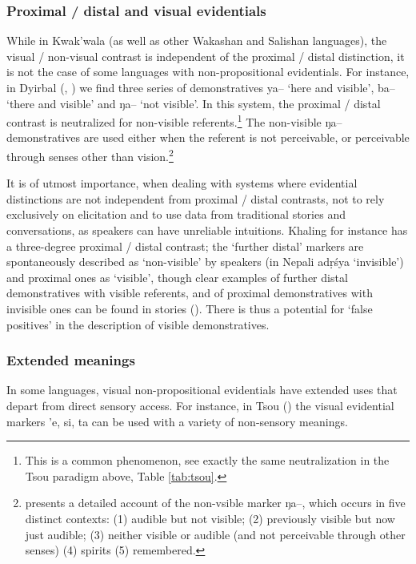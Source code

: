 \documentclass[oneside,a4paper,11pt]{article}
\newcommand{\ipa}[1]{{\phon \mbox{#1}}} %
\begin{document}
\subsubsection{Proximal / distal and visual evidentials} \label{sec:proximal}
While in Kwak'wala (as well as other Wakashan and Salishan languages), the visual / non-visual contrast is independent of the proximal / distal distinction, it is not the case of some languages with non-propositional evidentials. For instance, in Dyirbal (\citealt[45]{dixon72dyirbal}, \citealt{dixon14nonvisible}) we find three series of demonstratives \ipa{ya--} `here and visible', \ipa{ba--} `there and visible' and \ipa{ŋa--} `not visible'. In this system, the proximal / distal contrast is neutralized for non-visible referents.\footnote{This is a common phenomenon, see exactly the same neutralization in the Tsou paradigm above, Table \ref{tab:tsou}.} The non-visible \ipa{ŋa--} demonstratives are used either when the referent is not perceivable, or perceivable through senses other than vision.\footnote{\citet{dixon14nonvisible} presents a detailed account of the non-vsible marker  \ipa{ŋa--}, which occurs in five distinct contexts: (1) audible but not visible; (2) previously visible but now just audible; (3) neither visible or audible (and not perceivable through other senses) (4) spirits (5) remembered.  } 

It is of utmost importance, when dealing with systems where evidential distinctions are not independent from proximal / distal contrasts, not to rely exclusively on elicitation and to use data from traditional stories and conversations, as speakers can have unreliable intuitions. Khaling for instance has a three-degree proximal / distal contrast; the `further distal' markers are spontaneously described as `non-visible' by speakers (in Nepali \ipa{adṛśya} `invisible') and proximal ones as `visible', though clear examples of further distal demonstratives with visible referents, and of proximal demonstratives with invisible ones can be found in stories (\citealt[399]{jacques14auditory}). There is thus a potential for `false positives' in the description of visible demonstratives.

\subsubsection{Extended meanings} \label{sec:extended.visible}
In some languages, visual non-propositional evidentials have extended uses that depart from direct sensory access. For instance, in Tsou (\citealt[55-8]{yang00tsou.case}) the visual evidential markers \ipa{'e},  \ipa{si},  \ipa{ta} can be used with a variety of non-sensory meanings. 
\end{document}
